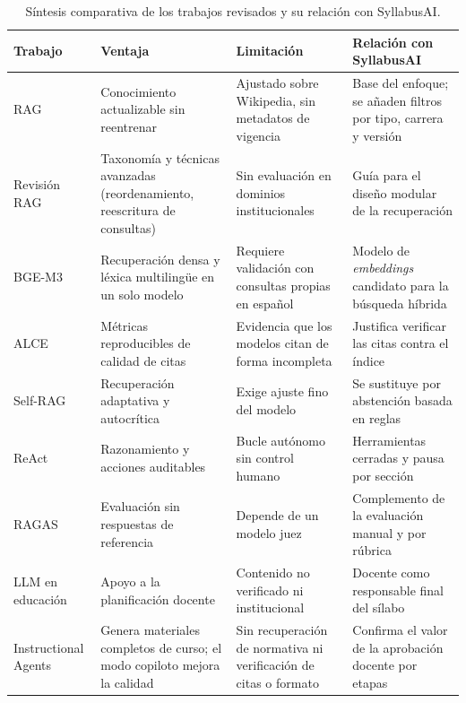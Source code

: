 \begin{table}[htbp]
  \centering
  \caption{Síntesis comparativa de los trabajos revisados y su relación con SyllabusAI.}
  \label{tab:estado_arte}
  \footnotesize
  \setlength{\tabcolsep}{4pt}
  \renewcommand{\arraystretch}{1.25}
  \begin{tabular}{|>{\raggedright\arraybackslash}p{2.3cm}|>{\raggedright\arraybackslash}p{3.3cm}|>{\raggedright\arraybackslash}p{3.3cm}|>{\raggedright\arraybackslash}p{3.6cm}|}
    \hline
    \textbf{Trabajo} & \textbf{Ventaja} & \textbf{Limitación} & \textbf{Relación con SyllabusAI} \\
    \hline
    RAG~\cite{lewis2020rag} & Conocimiento actualizable sin reentrenar & Ajustado sobre Wikipedia, sin metadatos de vigencia & Base del enfoque; se añaden filtros por tipo, carrera y versión \\
    \hline
    Revisión RAG~\cite{gao2023ragsurvey} & Taxonomía y técnicas avanzadas (reordenamiento, reescritura de consultas) & Sin evaluación en dominios institucionales & Guía para el diseño modular de la recuperación \\
    \hline
    BGE-M3~\cite{chen2024bgem3} & Recuperación densa y léxica multilingüe en un solo modelo & Requiere validación con consultas propias en español & Modelo de \textit{embeddings} candidato para la búsqueda híbrida \\
    \hline
    ALCE~\cite{gao2023alce} & Métricas reproducibles de calidad de citas & Evidencia que los modelos citan de forma incompleta & Justifica verificar las citas contra el índice \\
    \hline
    Self-RAG~\cite{asai2024selfrag} & Recuperación adaptativa y autocrítica & Exige ajuste fino del modelo & Se sustituye por abstención basada en reglas \\
    \hline
    ReAct~\cite{yao2023react} & Razonamiento y acciones auditables & Bucle autónomo sin control humano & Herramientas cerradas y pausa por sección \\
    \hline
    RAGAS~\cite{es2024ragas} & Evaluación sin respuestas de referencia & Depende de un modelo juez & Complemento de la evaluación manual y por rúbrica \\
    \hline
    LLM en educación~\cite{kasneci2023chatgpt} & Apoyo a la planificación docente & Contenido no verificado ni institucional & Docente como responsable final del sílabo \\
    \hline
    Instructional Agents~\cite{yao2025instructional} & Genera materiales completos de curso; el modo copiloto mejora la calidad & Sin recuperación de normativa ni verificación de citas o formato & Confirma el valor de la aprobación docente por etapas \\

\end{tabular}
\end{table}
